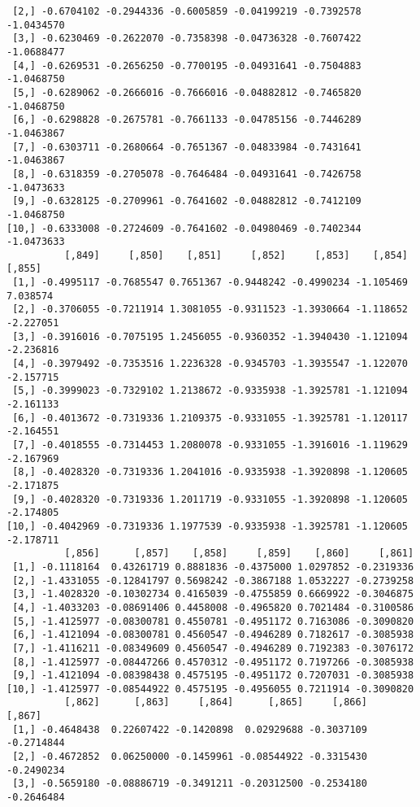 \documentclass[
  letterpaper,
  DIV=11,
  numbers=noendperiod]{scrreprt}
\begin{document}
\begin{verbatim}
 [2,] -0.6704102 -0.2944336 -0.6005859 -0.04199219 -0.7392578 -1.0434570
 [3,] -0.6230469 -0.2622070 -0.7358398 -0.04736328 -0.7607422 -1.0688477
 [4,] -0.6269531 -0.2656250 -0.7700195 -0.04931641 -0.7504883 -1.0468750
 [5,] -0.6289062 -0.2666016 -0.7666016 -0.04882812 -0.7465820 -1.0468750
 [6,] -0.6298828 -0.2675781 -0.7661133 -0.04785156 -0.7446289 -1.0463867
 [7,] -0.6303711 -0.2680664 -0.7651367 -0.04833984 -0.7431641 -1.0463867
 [8,] -0.6318359 -0.2705078 -0.7646484 -0.04931641 -0.7426758 -1.0473633
 [9,] -0.6328125 -0.2709961 -0.7641602 -0.04882812 -0.7412109 -1.0468750
[10,] -0.6333008 -0.2724609 -0.7641602 -0.04980469 -0.7402344 -1.0473633
          [,849]     [,850]    [,851]     [,852]     [,853]    [,854]    [,855]
 [1,] -0.4995117 -0.7685547 0.7651367 -0.9448242 -0.4990234 -1.105469  7.038574
 [2,] -0.3706055 -0.7211914 1.3081055 -0.9311523 -1.3930664 -1.118652 -2.227051
 [3,] -0.3916016 -0.7075195 1.2456055 -0.9360352 -1.3940430 -1.121094 -2.236816
 [4,] -0.3979492 -0.7353516 1.2236328 -0.9345703 -1.3935547 -1.122070 -2.157715
 [5,] -0.3999023 -0.7329102 1.2138672 -0.9335938 -1.3925781 -1.121094 -2.161133
 [6,] -0.4013672 -0.7319336 1.2109375 -0.9331055 -1.3925781 -1.120117 -2.164551
 [7,] -0.4018555 -0.7314453 1.2080078 -0.9331055 -1.3916016 -1.119629 -2.167969
 [8,] -0.4028320 -0.7319336 1.2041016 -0.9335938 -1.3920898 -1.120605 -2.171875
 [9,] -0.4028320 -0.7319336 1.2011719 -0.9331055 -1.3920898 -1.120605 -2.174805
[10,] -0.4042969 -0.7319336 1.1977539 -0.9335938 -1.3925781 -1.120605 -2.178711
          [,856]      [,857]    [,858]     [,859]    [,860]     [,861]
 [1,] -0.1118164  0.43261719 0.8881836 -0.4375000 1.0297852 -0.2319336
 [2,] -1.4331055 -0.12841797 0.5698242 -0.3867188 1.0532227 -0.2739258
 [3,] -1.4028320 -0.10302734 0.4165039 -0.4755859 0.6669922 -0.3046875
 [4,] -1.4033203 -0.08691406 0.4458008 -0.4965820 0.7021484 -0.3100586
 [5,] -1.4125977 -0.08300781 0.4550781 -0.4951172 0.7163086 -0.3090820
 [6,] -1.4121094 -0.08300781 0.4560547 -0.4946289 0.7182617 -0.3085938
 [7,] -1.4116211 -0.08349609 0.4560547 -0.4946289 0.7192383 -0.3076172
 [8,] -1.4125977 -0.08447266 0.4570312 -0.4951172 0.7197266 -0.3085938
 [9,] -1.4121094 -0.08398438 0.4575195 -0.4951172 0.7207031 -0.3085938
[10,] -1.4125977 -0.08544922 0.4575195 -0.4956055 0.7211914 -0.3090820
          [,862]      [,863]     [,864]      [,865]     [,866]     [,867]
 [1,] -0.4648438  0.22607422 -0.1420898  0.02929688 -0.3037109 -0.2714844
 [2,] -0.4672852  0.06250000 -0.1459961 -0.08544922 -0.3315430 -0.2490234
 [3,] -0.5659180 -0.08886719 -0.3491211 -0.20312500 -0.2534180 -0.2646484

\end{verbatim}
\end{document}
